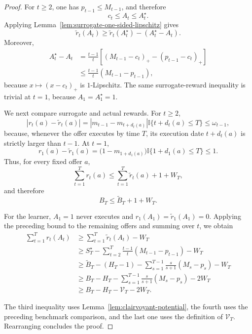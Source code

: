 \documentclass[11pt]{article}
\theoremstyle{definition}
\begin{document}
\begin{proof}
For $t\ge2$, one has $p_{t-1}\le M_{t-1}$, and therefore
\[
    c_t\le A_t\le A_t^\star.
\]
Applying Lemma~\ref{lem:surrogate-one-sided-lipschitz} gives
\[
    \widetilde r_t(A_t)
    \ge
    \widetilde r_t(A_t^\star)-(A_t^\star-A_t).
\]
Moreover,
\begin{align*}
    A_t^\star-A_t
    &=
    \frac{t-1}{t}
    \left[
        (M_{t-1}-c_t)_+
        -
        (p_{t-1}-c_t)_+
    \right]
    \\
    &\le
    \frac{t-1}{t}(M_{t-1}-p_{t-1}),
\end{align*}
because $x\mapsto(x-c_t)_+$ is $1$-Lipschitz. The same
surrogate-reward inequality is trivial at $t=1$, because
$A_1=A_1^\star=1$.

We next compare surrogate and actual rewards. For $t\ge2$,
\[
    \left|r_t(a)-\widetilde r_t(a)\right|
    =
    \left|m_{t-1}-m_{t+d_t(a)}\right|
    \mathbb{I}\{t+d_t(a)\le T\}
    \le
    \omega_{t-1},
\]
because, whenever the offer executes by time $T$, its execution date
$t+d_t(a)$ is strictly larger than $t-1$. At $t=1$,
\[
    r_1(a)-\widetilde r_1(a)
    =
    \bigl(1-m_{1+d_1(a)}\bigr)
    \mathbb{I}\{1+d_1(a)\le T\}
    \le1.
\]
Thus, for every fixed offer $a$,
\[
    \sum_{t=1}^T r_t(a)
    \le
    \sum_{t=1}^T\widetilde r_t(a)+1+W_T,
\]
and therefore
\[
    B_T\le\widetilde B_T+1+W_T.
\]

For the learner, $A_1=1$ never executes and
$r_1(A_1)=\widetilde r_1(A_1)=0$. Applying the preceding bound to the
remaining offers and summing over $t$, we obtain
\begin{align*}
    \sum_{t=1}^T r_t(A_t)
    &\ge
    \sum_{t=1}^T\widetilde r_t(A_t)-W_T
    \\
    &\ge
    S_T^\star
    -
    \sum_{t=2}^T
    \frac{t-1}{t}(M_{t-1}-p_{t-1})
    -
    W_T
    \\
    &\ge
    \widetilde B_T-(H_T-1)
    -
    \sum_{s=1}^{T-1}
    \frac{s}{s+1}(M_s-p_s)
    -
    W_T
    \\
    &\ge
    B_T-H_T
    -
    \sum_{s=1}^{T-1}
    \frac{s}{s+1}(M_s-p_s)
    -
    2W_T
    \\
    &\ge
    B_T-H_T-\mathcal{V}_T-2W_T.
\end{align*}

The third inequality uses
Lemma~\ref{lem:clairvoyant-potential}, the fourth uses the preceding
benchmark comparison, and the last one uses the definition of
$\mathcal{V}_T$. Rearranging concludes the proof.
\end{proof}
\end{document}
